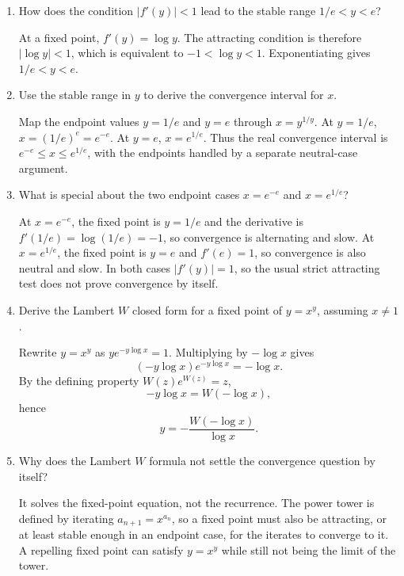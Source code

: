 \documentclass{essay}
\begin{document}
\begin{enumerate}
  \item How does the condition \(|f'(y)|<1\) lead to the stable range
    \(1/e<y<e\)?
    \begin{answer}
      At a fixed point, \(f'(y)=\log y\). The attracting condition is therefore
      \(|\log y|<1\), which is equivalent to
      \(-1<\log y<1\). Exponentiating gives \(1/e<y<e\).
    \end{answer}

  \item Use the stable range in \(y\) to derive the convergence interval for
    \(x\).
    \begin{answer}
      Map the endpoint values \(y=1/e\) and \(y=e\) through
      \(x=y^{1/y}\). At \(y=1/e\), \(x=(1/e)^{e}=e^{-e}\). At \(y=e\),
      \(x=e^{1/e}\). Thus the real convergence interval is
      \(e^{-e}\le x\le e^{1/e}\), with the endpoints handled by a separate
      neutral-case argument.
    \end{answer}

  \item What is special about the two endpoint cases \(x=e^{-e}\) and
    \(x=e^{1/e}\)?
    \begin{answer}
      At \(x=e^{-e}\), the fixed point is \(y=1/e\) and the derivative is
      \(f'(1/e)=\log(1/e)=-1\), so convergence is alternating and slow. At
      \(x=e^{1/e}\), the fixed point is \(y=e\) and \(f'(e)=1\), so
      convergence is also neutral and slow. In both cases \(|f'(y)|=1\), so
      the usual strict attracting test does not prove convergence by itself.
    \end{answer}

  \item Derive the Lambert \(W\) closed form for a fixed point of
    \(y=x^{y}\), assuming \(x\ne1\).
    \begin{answer}
      Rewrite \(y=x^{y}\) as \(y e^{-y\log x}=1\). Multiplying by
      \(-\log x\) gives
      \[ (-y\log x)e^{-y\log x}=-\log x. \]
      By the defining property \(W(z)e^{W(z)}=z\),
      \[ -y\log x=W(-\log x), \]
      hence
      \[ y=-\frac{W(-\log x)}{\log x}. \]
    \end{answer}

  \item Why does the Lambert \(W\) formula not settle the convergence question
    by itself?
    \begin{answer}
      It solves the fixed-point equation, not the recurrence. The power tower
      is defined by iterating \(a_{n+1}=x^{a_{n}}\), so a fixed point must also
      be attracting, or at least stable enough in an endpoint case, for the
      iterates to converge to it. A repelling fixed point can satisfy
      \(y=x^{y}\) while still not being the limit of the tower.
    \end{answer}


\end{enumerate}
\end{document}

